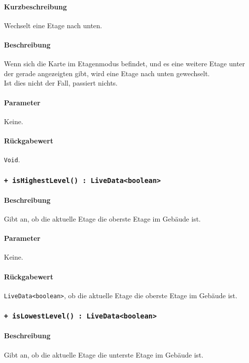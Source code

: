 \paragraph*{Kurzbeschreibung}
Wechselt eine Etage nach unten.
\paragraph*{Beschreibung}
Wenn sich die Karte im Etagenmodus befindet, und es eine weitere Etage unter der gerade 
angezeigten gibt, wird eine Etage nach unten gewechselt.\\
Ist dies nicht der Fall, passiert nichts.
\paragraph*{Parameter}
Keine.
\paragraph*{Rückgabewert}
\texttt{Void}.

\subsubsection*{\texttt{+ isHighestLevel() : LiveData<boolean>}}\label{App_Map_ViewModel_isHighestLevel}%
\paragraph*{Beschreibung}
Gibt an, ob die aktuelle Etage die oberste Etage im Gebäude ist.
\paragraph*{Parameter}
Keine.
\paragraph*{Rückgabewert}
\texttt{LiveData<boolean>}, ob die aktuelle Etage die oberste Etage im Gebäude ist.

\subsubsection*{\texttt{+ isLowestLevel() : LiveData<boolean>}}\label{App_Map_ViewModel_isLowestLevel}%
\paragraph*{Beschreibung}
Gibt an, ob die aktuelle Etage die unterste Etage im Gebäude ist.

